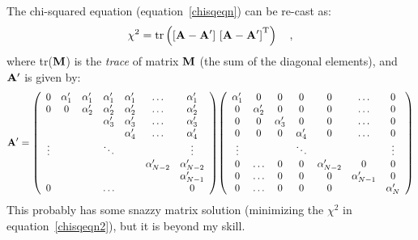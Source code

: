 \documentclass[11pt]{article}
\begin{document}
The chi-squared equation (equation~\ref{chisqeqn}) can be re-cast as:
\begin{equation}
   \chi^2 = {\rm tr}\left(\left[{\bf A} - {\bf A}'\right] \,
                          \left[{\bf A} - {\bf A}'\right]^{\rm T}\right)
   \quad ,
   \label{chisqeqn2}
\end{equation}
where tr(${\bf M}$) is the {\it trace} of matrix $\bf M$ (the sum of
the diagonal elements), and ${\bf A}'$ is given by:
\begin{equation}
   {\bf A}' = {\left(
              \begin{array}{ccccccc}
              0 & \alpha'_1 & \alpha'_1 & \alpha'_1 & \alpha'_1
                & \ldots & \alpha'_1 \\
              0 & 0 & \alpha'_2 & \alpha'_2 & \alpha'_2
                & \ldots & \alpha'_2 \\
                & & & \alpha'_3 & \alpha'_3 & \ldots & \alpha'_3 \\
                & & & & \alpha'_4 & \ldots & \alpha'_4 \\
              \vdots & & & \ddots & & & \vdots \\
                & & & & & \alpha'_{N-2} & \alpha'_{N-2} \\
                & & & & & & \alpha'_{N-1} \\
              0 & & & \ldots & & & 0
              \end{array}
              \right)}
              {\left(
              \begin{array}{ccccccc}
              \alpha'_1 & 0 & 0 & 0 & 0 & \ldots & 0 \\
              0 & \alpha'_2 & 0 & 0 & 0 & \ldots & 0 \\
              0 & 0 & \alpha'_3 & 0 & 0 & \ldots & 0 \\
              0 & 0 & 0 & \alpha'_4 & 0 & \ldots & 0 \\
              \vdots & & & \ddots & & & \vdots \\
              0 & \ldots & 0 & 0 & \alpha'_{N-2} & 0 & 0 \\
              0 & \ldots & 0 & 0 & 0 & \alpha'_{N-1} & 0 \\
              0 & \ldots & 0 & 0 & 0 & & \alpha'_N \\
              \end{array}
              \right)}
\end{equation}
This probably has some snazzy matrix solution (minimizing the
$\chi^2$ in equation~\ref{chisqeqn2}), but it is beyond my skill.
\end{document}
